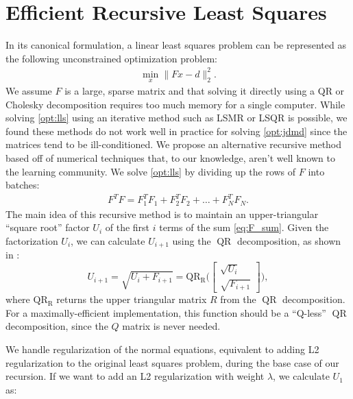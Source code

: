 \documentclass{article}
\begin{document}
\section{Efficient Recursive Least Squares} \label{sec:rls}
In its canonical formulation, a linear least squares problem can be represented as the
following unconstrained optimization problem:
\begin{align} \label{opt:lls}
  \min_x \|Fx - d\|_2^2.
\end{align}
We assume $F$ is a large, sparse matrix and that solving it directly using a QR or Cholesky
decomposition requires too much memory for a single computer. While solving \eqref{opt:lls}
using an iterative method such as LSMR \cite{Fong2011} or LSQR \cite{Paige1982} is possible,
we found these methods do not work well in practice for solving \eqref{opt:jdmd} since the 
matrices tend to be ill-conditioned. We propose an alternative recursive method based off of 
numerical techniques that, to our knowledge, aren't well known to the learning community. 
We solve \eqref{opt:lls} by dividing up the rows of $F$ into batches:
\begin{align} \label{eq:F_sum}
  F^T F = F_1^T F_1 + F_2^T F_2 + \ldots + F_N^T F_N.
\end{align}
The main idea of this recursive method is to maintain an upper-triangular ``square root''
factor $U_i$ of the first $i$ terms of the sum \eqref{eq:F_sum}. Given the factorization 
$U_i$, we can calculate $U_{i+1}$ using the $\operatorname{QR}$ decomposition, as shown in
\cite{Howell2019}:
\begin{equation}
  U_{i+1} = \sqrt{U_i + F_{i+1}} = 
  \operatorname{QR_R}\bigg( \begin{bmatrix} \sqrt{U_i} \\ \sqrt{F_{i+1}} \end{bmatrix} \bigg),
\end{equation}
where $\operatorname{QR_R}$ returns the upper triangular matrix $R$ from the 
$\operatorname{QR}$ decomposition. For a maximally-efficient implementation, this function 
should be a ``Q-less'' $\operatorname{QR}$ decomposition, since the $Q$ matrix is never 
needed.

We handle regularization of the normal equations, equivalent to adding L2 regularization to 
the original least squares problem, during the base case of our recursion. If we want to 
add an L2 regularization with weight $\lambda$, we calculate $U_1$ as:
\end{document}

